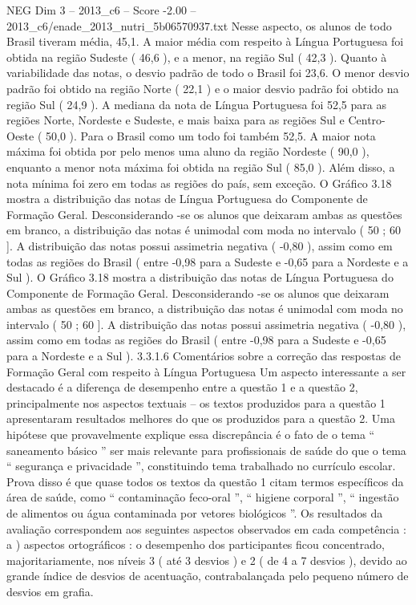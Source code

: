\begin{textsample}{NEG Dim 3 – 2013\_c6 – Score -2.00 – 2013\_c6/enade\_2013\_nutri\_5b06570937.txt}
Nesse aspecto, os alunos de todo Brasil tiveram média, 45,1.
A maior média com respeito à Língua Portuguesa foi obtida na região Sudeste ( 46,6 ), e a menor, na região Sul ( 42,3 ).
Quanto à variabilidade das notas, o desvio padrão de todo o Brasil foi 23,6.
O menor desvio padrão foi obtido na região Norte ( 22,1 ) e o maior desvio padrão foi obtido na região Sul ( 24,9 ).
A mediana da nota de Língua Portuguesa foi 52,5 para as regiões Norte, Nordeste e Sudeste, e mais baixa para as regiões Sul e Centro-Oeste ( 50,0 ).
Para o Brasil como um todo foi também 52,5.
A maior nota máxima foi obtida por pelo menos uma aluno da região Nordeste ( 90,0 ), enquanto a menor nota máxima foi obtida na região Sul ( 85,0 ).
Além disso, a nota mínima foi zero em todas as regiões do país, sem exceção.
O Gráfico 3.18 mostra a distribuição das notas de Língua Portuguesa do Componente de Formação Geral.
Desconsiderando -se os alunos que deixaram ambas as questões em branco, a distribuição das notas é unimodal com moda no intervalo ( 50 ; 60 ].
A distribuição das notas possui assimetria negativa ( -0,80 ), assim como em todas as regiões do Brasil ( entre -0,98 para a Sudeste e -0,65 para a Nordeste e a Sul ).
O Gráfico 3.18 mostra a distribuição das notas de Língua Portuguesa do Componente de Formação Geral.
Desconsiderando -se os alunos que deixaram ambas as questões em branco, a distribuição das notas é unimodal com moda no intervalo ( 50 ; 60 ].
A distribuição das notas possui assimetria negativa ( -0,80 ), assim como em todas as regiões do Brasil ( entre -0,98 para a Sudeste e -0,65 para a Nordeste e a Sul ). 3.3.1.6 Comentários sobre a correção das respostas de Formação Geral com respeito à Língua Portuguesa Um aspecto interessante a ser destacado é a diferença de desempenho entre a questão 1 e a questão 2, principalmente nos aspectos textuais – os textos produzidos para a questão 1 apresentaram resultados melhores do que os produzidos para a questão 2.
Uma hipótese que provavelmente explique essa discrepância é o fato de o tema “ saneamento básico ” ser mais relevante para profissionais de saúde do que o tema “ segurança e privacidade ”, constituindo tema trabalhado no currículo escolar.
Prova disso é que quase todos os textos da questão 1 citam termos específicos da área de saúde, como “ contaminação feco-oral ”, “ higiene corporal ”, “ ingestão de alimentos ou água contaminada por vetores biológicos ”.
Os resultados da avaliação correspondem aos seguintes aspectos observados em cada competência : a ) aspectos ortográficos : o desempenho dos participantes ficou concentrado, majoritariamente, nos níveis 3 ( até 3 desvios ) e 2 ( de 4 a 7 desvios ), devido ao grande índice de desvios de acentuação, contrabalançada pelo pequeno número de desvios em grafia.

\end{textsample}
